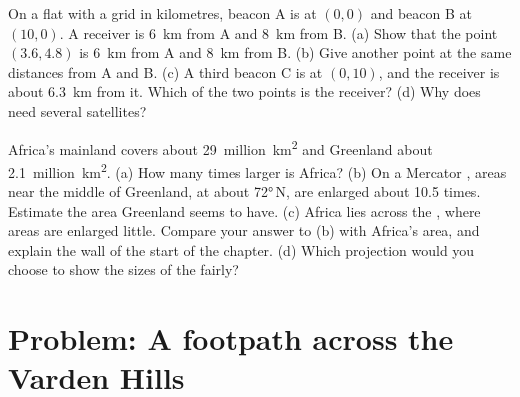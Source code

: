 \begin{exercise}[$\star\star\star$]\label{exo:g9:maps-of-the-earth:11}
On a flat  with a grid in kilometres, beacon A is at $(0, 0)$ and
beacon B at $(10, 0)$. A receiver is \qty{6}{km} from A and \qty{8}{km}
from B. (a) Show that the point $(3.6, 4.8)$ is \qty{6}{km} from A and
\qty{8}{km} from B. (b) Give another point at the same distances from A
and B. (c) A third beacon C is at $(0, 10)$, and the receiver is about
\qty{6.3}{km} from it. Which of the two points is the receiver? (d) Why
does  need several satellites?
\end{exercise}

\begin{exercise}[$\star\star\star$]\label{exo:g9:maps-of-the-earth:12}
Africa's mainland covers about 29~million~\unit{km^2} and Greenland about
2.1~million~\unit{km^2}. (a) How many times larger is Africa? (b) On a
Mercator , areas near the middle of Greenland, at about \ang{72}\,N,
are enlarged about 10.5 times. Estimate the area Greenland seems to have.
(c) Africa lies across the , where areas are enlarged little.
Compare your answer to (b) with Africa's area, and explain the wall  of
the start of the chapter. (d) Which projection would you choose to show
the sizes of the  fairly?
\end{exercise}

\section{Problem: A footpath across the Varden Hills}

